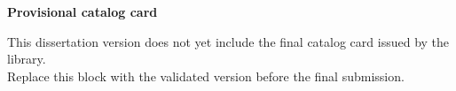 \begin{fichacatalografica}

\vspace*{\fill}
\begin{center}
  \textbf{Provisional catalog card}

  \vspace{1em}
  This dissertation version does not yet include the final catalog card issued by the library.
  \\
  Replace this block with the validated version before the final submission.
\end{center}
\vspace*{\fill}

\end{fichacatalografica}
